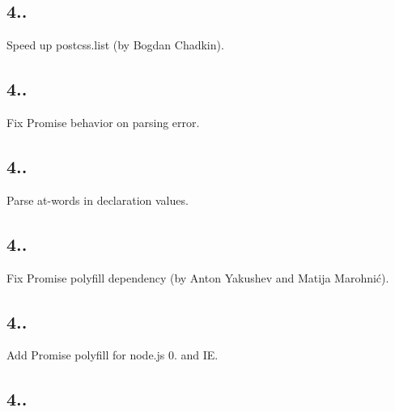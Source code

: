 \subsection*{4..}


\begin{DoxyItemize}
\item Speed up {\ttfamily postcss.\+list} (by Bogdan Chadkin).
\end{DoxyItemize}

\subsection*{4..}


\begin{DoxyItemize}
\item Fix Promise behavior on parsing error.
\end{DoxyItemize}

\subsection*{4..}


\begin{DoxyItemize}
\item Parse at-\/words in declaration values.
\end{DoxyItemize}

\subsection*{4..}


\begin{DoxyItemize}
\item Fix Promise polyfill dependency (by Anton Yakushev and Matija Marohnić).
\end{DoxyItemize}

\subsection*{4..}


\begin{DoxyItemize}
\item Add Promise polyfill for node.\+js 0. and IE.
\end{DoxyItemize}

\subsection*{4..}


